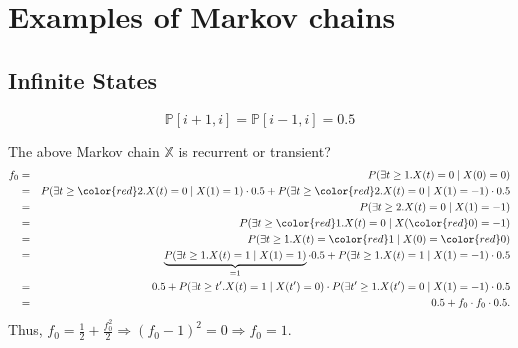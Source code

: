 \section{Examples of Markov chains}

\subsection{Infinite States} \label{subsec:infinite-states}

\begin{figure}[htp]
\centering
{}
\[ \mathbb{P}[i + 1, i] = \mathbb{P}[i - 1, i] = 0.5 \]
\end{figure}

\begin{question}
The above Markov chain $ \mathbb{X} $ is recurrent or transient?
\begin{eqnarray*}
f_{0}
  & = & P(\exists t \ge 1 . X(t) = 0 \mid X(0) = 0) \\
  & = & P(\exists t \ge {\color{red} 2} . X(t) = 0 \mid X(1) = 1) \cdot 0.5
        + P(\exists t \ge {\color{red} 2} . X(t) = 0 \mid X(1) = -1) \cdot 0.5 \\
  & = & P(\exists t \ge 2 . X(t) = 0 \mid X(1) = -1) \\
  & = & P(\exists t \ge {\color{red} 1} . X(t) = 0 \mid X({\color{red} 0}) = -1) \\
  & = & P(\exists t \ge 1 . X(t) = {\color{red} 1} \mid X(0) = {\color{red} 0}) \\
  & = & \underbrace{P(\exists t \ge 1 . X(t) = 1 \mid X(1) = 1)}_{= 1} \cdot 0.5
        + P(\exists t \ge 1 . X(t) = 1 \mid X(1) = -1) \cdot 0.5 \\
  & = & 0.5 + P(\exists t \ge t' . X(t) = 1 \mid X(t') = 0) \cdot P(\exists t' \ge 1 . X(t') = 0 \mid X(1) = -1) \cdot 0.5 \\
  & = & 0.5 + f_{0} \cdot f_{0} \cdot 0.5.
\end{eqnarray*}
Thus, $ f_{0} = \frac{1}{2} + \frac{f_{0}^{2}}{2} \Rightarrow (f_{0} - 1)^{2} = 0 \Rightarrow f_{0} = 1 $.
\end{question}

